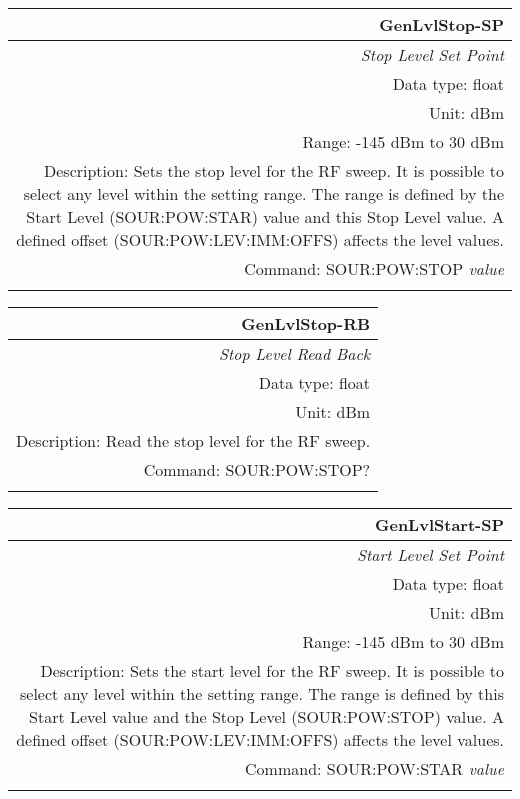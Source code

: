 \documentclass[openany]{article}
\begin{document}
		\begin{tabular}{N}
			\hline
			\bfseries GenLvlStop-SP \\ \hline
			\emph{Stop Level Set Point} \\
			Data type: float \\
			Unit: dBm \\
			Range: -145 dBm to 30 dBm \\
			Description: Sets the stop level for the RF sweep. It is possible to select any level within the setting range. The range is defined by the Start Level (SOUR:POW:STAR) value and this Stop Level value. A defined offset (SOUR:POW:LEV:IMM:OFFS) affects the level values. \\
			Command: SOUR:POW:STOP \emph{value} \\
			\\

		\end{tabular}


		\begin{tabular}{N}
			\hline
			\bfseries GenLvlStop-RB \\ \hline
			\emph{Stop Level Read Back} \\
			Data type: float \\
			Unit: dBm \\
			Description: Read the stop level for the RF sweep. \\
			Command: SOUR:POW:STOP? \\
			\\
			
		\end{tabular}


		\begin{tabular}{N}
			\hline
			\bfseries GenLvlStart-SP \\ \hline
			\emph{Start Level Set Point} \\
			Data type: float \\
			Unit: dBm \\
			Range: -145 dBm to 30 dBm \\
			Description: Sets the start level for the RF sweep. It is possible to select any level within the setting range. The range is defined by this Start Level value and the Stop Level (SOUR:POW:STOP) value. A defined offset (SOUR:POW:LEV:IMM:OFFS) affects the level values. \\
			Command: SOUR:POW:STAR \emph{value} \\
			\\

		\end{tabular}
\end{document}
